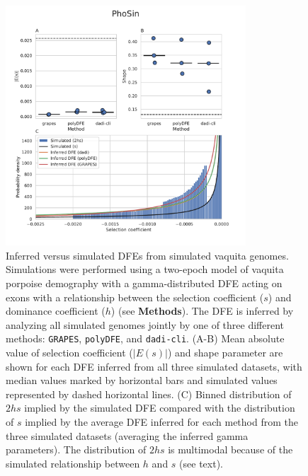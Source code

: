 \documentclass[hidelinks]{article}
\newcommand{\polydfe}{\texttt{polyDFE}\xspace}
\newcommand{\dadicli}{\texttt{dadi-cli}\xspace}
\newcommand{\grapes}{\texttt{GRAPES}\xspace}
\begin{document}
    \begin{figure}[b!]
        \centering
        \includegraphics[width=0.8\textwidth]{figures/PhoSin/Vaquita2Epoch_1R22/PhoSin_Vaquita2Epoch_1R22_Gamma_R22_Phocoena_sinus.mPhoSin1.pri.110_exons_DFE_plot.pdf}
        \caption{
        \label{fig:vaquita-dfe}
        Inferred versus simulated DFEs from simulated vaquita genomes.
        Simulations were performed using a two-epoch model of vaquita porpoise demography with a gamma-distributed DFE
        acting on exons with a relationship between the selection coefficient ($s$) and dominance coefficient ($h$) (see \textbf{Methods}).
        The DFE is inferred by analyzing all simulated genomes jointly by one of three different methods:
        \grapes, \polydfe, and \dadicli.
        (A-B) Mean absolute value of selection coefficient ($\lvert E(s) \rvert $) and shape parameter are
        shown for each DFE inferred from all three simulated datasets,
        with median values marked by horizontal bars
        and simulated values represented by dashed horizontal lines. 
        (C) Binned distribution of $2hs$ implied by the simulated DFE compared with
        the distribution of $s$ implied by the average DFE inferred for each method from the three simulated datasets (averaging the inferred gamma parameters).
        The distribution of $2 h s$ is multimodal because of the simulated relationship between $h$ and $s$ (see text).
        }
    \end{figure}
    
\end{document}
